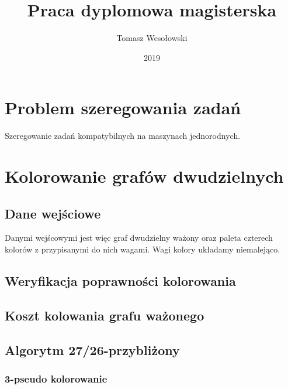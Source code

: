 \documentclass{article}
\title{Praca dyplomowa magisterska}
\author{Tomasz Wesołowski}
\date{2019}
\begin{document}
 
\maketitle
 
\tableofcontents
 
\section{Problem szeregowania zadań}

Szeregowanie zadań kompatybilnych na maszynach jednorodnych.

\section{Kolorowanie grafów dwudzielnych}

\subsection*{Dane wejściowe}

Danymi wejścowymi jest więc graf dwudzielny ważony oraz paleta czterech kolorów z przypisanymi do nich wagami. Wagi kolory układamy niemalejąco.

\subsection*{Weryfikacja poprawności kolorowania}



\subsection*{Koszt kolowania grafu ważonego}



\subsection{Algorytm 27/26-przybliżony}



\subsubsection*{3-pseudo kolorowanie}


\end{document}
